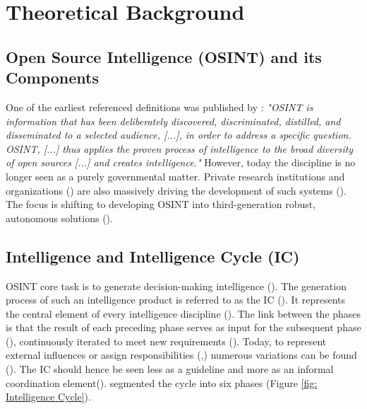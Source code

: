 \documentclass[10pt]{article}
\begin{document}
\section{Theoretical Background} \label{sec:theoreticalbackground}


\subsection{Open Source Intelligence (OSINT) and its Components}

One of the earliest referenced definitions
was published by \textcite{NorthAtlanticTreatyOrganization.2001}: \textit{"OSINT is information that has been
    deliberately discovered, discriminated, distilled, and disseminated to a selected audience,
    [...], in order to address a specific question. OSINT, [...] thus applies the proven
    process of intelligence to the broad diversity of open sources [...] and creates
    intelligence."} However, today the discipline is no longer seen as a purely governmental
matter. Private research institutions and organizations (\cite{Bohm.2021}) are
also massively driving the development of such systems
(\cite{Dokman.2020}). The focus is shifting to
developing OSINT into third-generation robust, autonomous solutions (\cite{PastorGalindo.2019}).

\subsection{Intelligence and Intelligence Cycle (IC)}

OSINT core task is to generate decision-making intelligence
(\cite{NorthAtlanticTreatyOrganization.2001}). The generation process of such an intelligence product
is referred to as the IC (\cite{CentralIntelligenceAgency.1987}).
It represents the central element of every intelligence discipline (\cite{Reuser.2017}).
The link between the phases is that the result of each preceding phase serves as input for the subsequent phase (\cite{JointChiefsofStaffU.S.Army.2013}), continuously iterated to meet new requirements (\cite{Gibson.2016}).
Today, to represent external influences or assign responsibilities (\cite{Lowenthal.2020,Phythian.2013},) numerous
variations can be found (\cite{Reuser.2017}). The IC should hence be seen less as a guideline and more as an informal
coordination element(\cite{Hwang.2022}). \textcite{JointChiefsofStaffU.S.Army.2013} segmented the cycle into six phases (Figure \ref{fig: Intelligence Cycle}).
\end{document}
